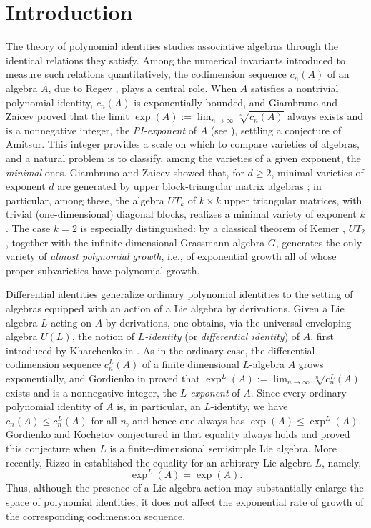 \documentclass[a4paper,reqno]{amsart}
\theoremstyle{definition}
\numberwithin{equation}{section}
\numberwithin{theorem}{section}
\begin{document}
\section{Introduction}
The theory of polynomial identities studies associative algebras through the identical
relations they satisfy. Among the numerical invariants introduced to measure such relations
quantitatively, the codimension sequence $c_n(A)$ of an algebra $A$, due to Regev  \cite{Regev1972}, plays a
central role. When $A$ satisfies a nontrivial polynomial identity, $c_n(A)$ is exponentially
bounded, and Giambruno and Zaicev proved that the limit
$\exp(A):=\lim_{n\to\infty}\sqrt[n]{c_n(A)}$ always exists and is a nonnegative integer, the
\emph{PI-exponent} of $A$ (see \cite[Chapter 6]{GiambrunoZaicevbook}), settling a conjecture of
Amitsur. This integer provides a scale on which to compare varieties of algebras, and a natural
problem is to classify, among the varieties of a given exponent, the \emph{minimal} ones.
Giambruno and Zaicev showed that, for $d\geq2$, minimal varieties of exponent $d$ are generated
by  upper block-triangular matrix algebras \cite{GiambrunoZaicev2003}; in
particular, among these, the algebra $UT_k$ of $k\times k$ upper triangular matrices, with
trivial (one-dimensional) diagonal blocks, realizes a minimal variety of exponent $k$. The case
$k=2$ is especially distinguished: by a classical theorem of Kemer \cite{Kemer1979}, $UT_2$, together with the
infinite dimensional Grassmann algebra $G$, generates the only variety of \emph{almost
polynomial growth}, i.e., of exponential growth all of whose proper subvarieties have
polynomial growth.

Differential identities generalize ordinary polynomial identities to the setting of algebras equipped with an action of a Lie algebra by derivations. Given a Lie algebra $L$ acting on $A$ by derivations, one obtains, via the
universal enveloping algebra $U(L)$, the notion of \emph{$L$-identity} (or \emph{differential identity}) of
$A$, first introduced by Kharchenko in \cite{Kharchenko1978}. As in the ordinary case, the differential codimension
sequence $c_n^L(A)$ of a finite dimensional $L$-algebra $A$ grows exponentially, and Gordienko in
\cite{Gordienko2013} proved that $\exp^L(A):=\lim_{n\to\infty}\sqrt[n]{c_n^L(A)}$ exists and is
a nonnegative integer, the \emph{$L$-exponent} of $A$. Since every ordinary polynomial identity of $A$ is, in particular, an $L$-identity, we have $c_n(A)\leq c_n^L(A)$ for all $n$, and hence
one always has $\exp(A)\leq\exp^L(A)$. Gordienko and Kochetov conjectured in \cite{GordienkoKochetov2014} that equality always holds and proved this conjecture when $L$ is a finite-dimensional semisimple Lie algebra. More recently, Rizzo in \cite{Rizzo2023} established the equality for an arbitrary Lie algebra $L$, namely,
$$
\exp^L(A)=\exp(A).
$$
Thus, although the presence of a Lie algebra action may substantially enlarge the space of polynomial identities, it does not affect the exponential rate of growth of the corresponding codimension sequence.
\end{document}
